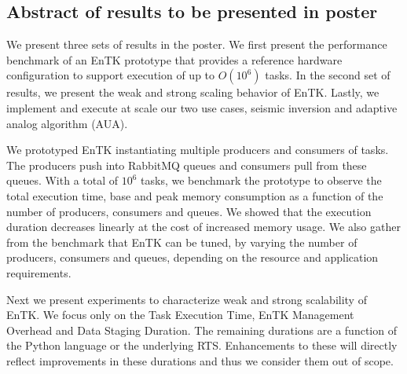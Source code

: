 
\subsection{Abstract of results to be presented in poster}

We present three sets of results in the poster. We first present the performance
benchmark of an EnTK prototype that provides a reference hardware configuration 
to support execution of up to $O(10^6)$ tasks. In the second set of results, we
present the weak and strong scaling behavior of EnTK. Lastly, we implement and 
execute at scale our two use cases, seismic inversion and adaptive analog 
algorithm (AUA).

We prototyped EnTK instantiating multiple producers and consumers of tasks.
The producers push into RabbitMQ queues and consumers pull from these queues.
With a total of $10^6$ tasks, we benchmark the prototype to observe the total
execution time, base and peak memory consumption as a function of the number of
producers, consumers and queues.
We showed that the execution duration decreases linearly at the cost of 
increased memory usage. We also gather from the benchmark that EnTK can be 
tuned, by varying the number of producers, consumers and queues, depending on 
the resource and application requirements.


Next we present experiments to characterize weak and strong scalability of EnTK.
We focus only on the Task Execution Time, EnTK Management Overhead and Data 
Staging Duration. The remaining durations are a function of the Python language 
or the underlying RTS. Enhancements to these will directly reflect improvements 
in these durations and thus we consider them out of scope.

